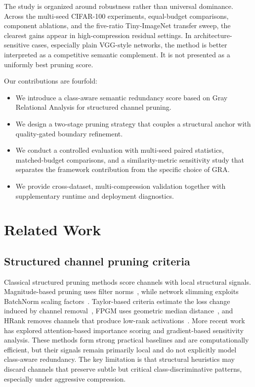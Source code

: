 \documentclass[preprint,12pt]{elsarticle}
\begin{document}
The study is organized around robustness rather than universal dominance. Across the multi-seed CIFAR-100 experiments, equal-budget comparisons, component ablations, and the five-ratio Tiny-ImageNet transfer sweep, the clearest gains appear in high-compression residual settings. In architecture-sensitive cases, especially plain VGG-style networks, the method is better interpreted as a competitive semantic complement. It is not presented as a uniformly best pruning score.

Our contributions are fourfold:
\begin{itemize}
    \item We introduce a class-aware semantic redundancy score based on Gray Relational Analysis for structured channel pruning.
    \item We design a two-stage pruning strategy that couples a structural anchor with quality-gated boundary refinement.
    \item We conduct a controlled evaluation with multi-seed paired statistics, matched-budget comparisons, and a similarity-metric sensitivity study that separates the framework contribution from the specific choice of GRA.
    \item We provide cross-dataset, multi-compression validation together with supplementary runtime and deployment diagnostics.
\end{itemize}

\section{Related Work}
\label{sec:related}

\subsection{Structured channel pruning criteria}

Classical structured pruning methods score channels with local structural signals. Magnitude-based pruning uses filter norms~\cite{li2017pruning}, while network slimming exploits BatchNorm scaling factors~\cite{liu2017network_slimming,ioffe2015batch}. Taylor-based criteria estimate the loss change induced by channel removal~\cite{molchanov2019taylor,molchanov2017variational}, FPGM uses geometric median distance~\cite{he2019fpgm}, and HRank removes channels that produce low-rank activations~\cite{lin2020hrank}. More recent work has explored attention-based importance scoring and gradient-based sensitivity analysis. These methods form strong practical baselines and are computationally efficient, but their signals remain primarily local and do not explicitly model class-aware redundancy. The key limitation is that structural heuristics may discard channels that preserve subtle but critical class-discriminative patterns, especially under aggressive compression.
\end{document}
